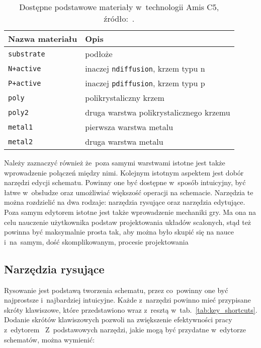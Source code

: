 \newpage
\begin{table}[h]
    \centering
    \caption[Dostępne materiały w~technologii Amis C5.]
    {Dostępne podstawowe materiały w~technologii Amis C5, źródło:~\cite{amis_params}.}
    \label{tab:amis_materials}
    \begin{tabular}{|l|l|}
        \hline
        Nazwa materiału & Opis \\
        \hline
        \hline
        \texttt{substrate} & podłoże \\
        \hline
        \texttt{N+active} & inaczej \texttt{ndiffusion}, krzem typu n\\
        \hline
        \texttt{P+active} & inaczej \texttt{pdiffusion}, krzem typu p\\
        \hline
        \texttt{poly} & polikrystaliczny krzem \\
        \hline
        \texttt{poly2} & druga warstwa polikrystalicznego krzemu \\
        \hline
        \texttt{metal1} & pierwsza warstwa metalu \\
        \hline
        \texttt{metal2} & druga warstwa metalu \\
        \hline
    \end{tabular}
\end{table}

Należy zaznaczyć również że~poza samymi warstwami istotne jest także wprowadzenie połączeń między nimi.
Kolejnym istotnym aspektem jest dobór narzędzi edycji schematu.
Powinny one być dostępne w~sposób intuicyjny, być łatwe w~obsłudze oraz umożliwiać większość operacji na schemacie.
Narzędzia te można rozdzielić na dwa rodzaje: narzędzia rysujące oraz narzędzia edytujące. \\
\indent Poza samym edytorem istotne jest także wprowadzenie mechaniki gry.
Ma ona na celu nauczenie użytkownika podstaw projektowania układów scalonych,
stąd też powinna być maksymalnie prosta tak, aby można było skupić się na nauce i~na~samym,
dość skomplikowanym, procesie projektowania

\subsection{Narzędzia rysujące}
\label{subsec:narzedzia_rysujace}

Rysowanie jest podstawą tworzenia schematu, przez co~powinny one być najprostsze i~najbardziej intuicyjne.
Każde z~narzędzi powinno mieć przypisane skróty klawiszowe,
które przedstawiono wraz z~resztą w~tab.~\ref{tab:key_shortcuts}. %
Dodanie skrótów klawiszowych pozwoli na zwiększenie efektywności pracy z~edytorem~\cite{shortcuts}
Z~podstawowych narzędzi, jakie mogą być przydatne w~edytorze schematów, można wymienić:

